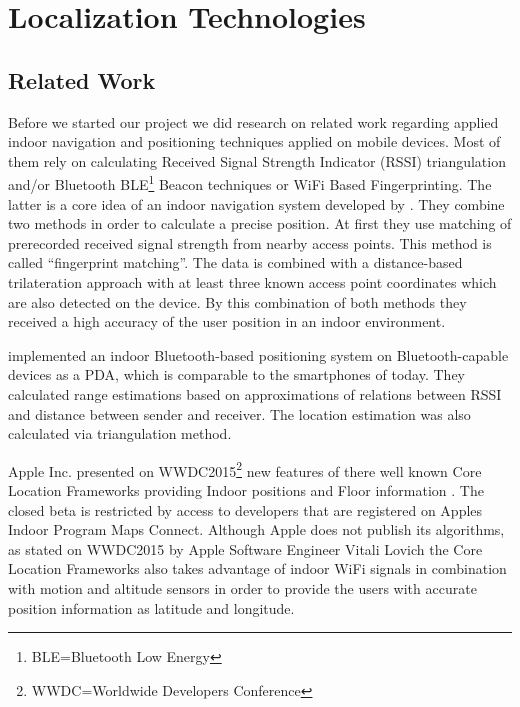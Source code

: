 \chapter{Localization Technologies}
\label{cha:relatedwork}

\section{Related Work}

Before we started our project we did research on related work regarding applied indoor navigation and positioning techniques applied on mobile devices. Most of them rely on calculating Received Signal Strength Indicator (RSSI) triangulation and/or Bluetooth BLE\footnote{BLE=Bluetooth Low Energy} Beacon techniques or WiFi Based Fingerprinting. The latter is a core idea of an indoor navigation system developed by \cite{ChaSo2012}. They combine two methods in order to calculate a precise position. At first they use matching of prerecorded received signal strength from nearby access points. This method is called \enquote{fingerprint matching}. The data is combined with a distance-based trilateration approach with at least three known access point coordinates which are also detected on the device. By this combination of both methods they received a high accuracy of the user position in an indoor environment.

\cite{Feldmann12} implemented an indoor Bluetooth-based positioning system on Bluetooth-capable devices as a PDA, which is comparable to the smartphones of today. They calculated range estimations based on approximations of relations between RSSI and distance between sender and receiver. The location estimation was also calculated via triangulation method.

Apple Inc. presented on WWDC2015\footnote{WWDC=Worldwide Developers Conference} new features of there well known Core Location Frameworks providing Indoor positions and Floor information \cite{wwdc15}. The closed beta is restricted by access to developers that are registered on Apples Indoor Program Maps Connect. Although Apple does not publish its algorithms, as stated on WWDC2015 by Apple Software Engineer Vitali Lovich the Core Location Frameworks also takes advantage of indoor WiFi signals in combination with motion and altitude sensors in order to provide the users with accurate position information as latitude and longitude.

